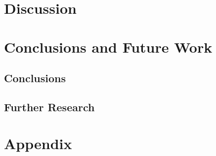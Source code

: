 \documentclass[11pt, a4paper, english]{book}
\begin{document}
\chapter{Discussion}


\chapter{Conclusions and Future Work}

\section{Conclusions}



\section{Further Research}


\pagebreak



\appendix
\chapter{Appendix}

\end{document}
